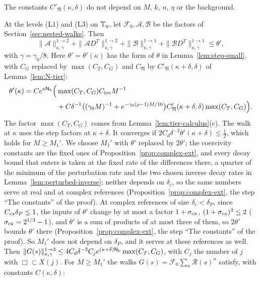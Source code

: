 The constants $C'_{\mathfrak N}(\kappa,\delta)$ do not depend on $M$, $k$, $n$, $\eta$ or the background.

\begin{theorem}\label{thm:tier-walk}
At the levels (L1) and (L3) on $\mathbb T_\eta$, let $\mathcal F_0,\mathcal A,\mathcal B$ be the factors of Section~\ref{sec:nested-walks}. Then
\[
\|\mathcal A\|^{1\to2}_{\kappa,\gamma}+\|\mathcal AD^T\|^{1\to2}_{\kappa,\gamma}+\|\mathcal B\|^{1\to1}_{\kappa,\gamma}+\|\mathcal BD^T\|^{1\to1}_{\kappa,\gamma}\le\theta',
\]
with $\gamma=\gamma_0/8$. Here $\theta'=\theta'(\kappa)$ has the form of $\theta$ in Lemma~\ref{lem:step-small}, with $C_G$ replaced by $\max(C_T,C_G)$ and $C_{\mathfrak N}$ by $C'_{\mathfrak N}(\kappa+\delta,\delta)$ of Lemma~\ref{lem:N-tier}:
\[
\begin{aligned}
\theta'(\kappa)=Ce^{\kappa\mathsf N_{\rm b}}\Big(&\max(C_T,C_G)C_{\rm loc}M^{-1}\\
&+C\delta^{-1}\big((\gamma_0M)^{-1}+e^{-\gamma_0(\rho-1)M/16}\big)C'_{\mathfrak N}(\kappa+\delta,\delta)\max(C_T,C_G)\Big).
\end{aligned}
\]
The factor $\max(C_T,C_G)$ comes from Lemma~\ref{lem:tier-calculus}(c). The walk at $\kappa$ uses the step factors at $\kappa+\delta$. It converges if $2C_d\delta^{-2}\theta'(\kappa+\delta)\le\frac12$, which holds for $M\ge M_1'$. We choose $M_1'$ with $\theta'$ replaced by $2\theta'$; the coercivity constants are the fixed ones of Proposition~\ref{prop:complex-ext}, and every decay bound that enters is taken at the fixed rate of the differences there, a quarter of the minimum of the perturbation rate and the two chosen inverse decay rates in Lemma~\ref{lem:perturbed-inverse}; neither depends on $\delta_c$, so the same numbers serve at real and at complex references (Proposition~\ref{prop:complex-ext}, the step ``The constants'' of the proof). At complex references of size $\delta_c<\delta_P$, since $C_{\rm cx}\delta_P\le1$, the inputs of $\theta'$ change by at most a factor $1+\sigma_{\rm cx}$, $(1+\sigma_{\rm cx})^3\le2$ ($\sigma_{\rm cx}=2^{1/3}-1$), and $\theta'$ is a sum of products of at most three of them, so $2\theta'$ bounds $\theta'$ there (Proposition~\ref{prop:complex-ext}, the step ``The constants'' of the proof). So $M_1'$ does not depend on $\delta_P$, and it serves at these references as well. Then $\|G(s)\|^{1\to3}_{\kappa,\gamma}\le4C_d\delta^{-2}C_je^{(\kappa+\delta)\mathsf N_{\rm b}}\max(C_T,C_G)$, with $C_j$ the number of $j$ with $\Box\subset X(j)$. For $M\ge M_1'$ the walks $G(s)=\mathcal F_0\sum_n\mathcal R(s)^n$ satisfy, with constants $C(\kappa,\delta)$:

\end{theorem}
